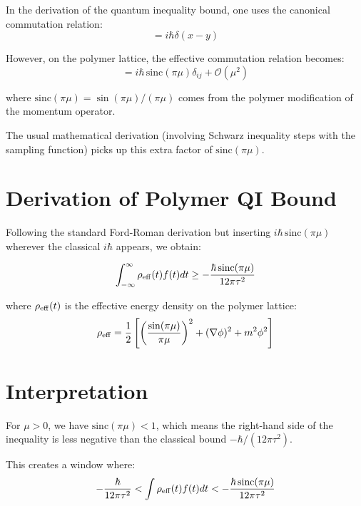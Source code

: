 \documentclass[11pt]{article}
\begin{document}
In the derivation of the quantum inequality bound, one uses the canonical commutation relation:
\begin{equation}
[\hat{\phi}(x), \hat{\pi}(y)] = i\hbar\delta(x-y)
\end{equation}

However, on the polymer lattice, the effective commutation relation becomes:
\begin{equation}
[\hat{\phi}_i, \hat{\pi}_j^{\rm poly}] = i\hbar\,\mathrm{sinc}(\pi\mu)\delta_{ij} + \mathcal{O}(\mu^2)
\end{equation}

where $\mathrm{sinc}(\pi\mu) = \sin(\pi\mu)/(\pi\mu)$ comes from the polymer modification of the momentum operator.

The usual mathematical derivation (involving Schwarz inequality steps with the sampling function) picks up this extra factor of $\mathrm{sinc}(\pi\mu)$.

\section{Derivation of Polymer QI Bound}

Following the standard Ford-Roman derivation but inserting $i\hbar\,\mathrm{sinc}(\pi\mu)$ wherever the classical $i\hbar$ appears, we obtain:

\begin{equation}
\int_{-\infty}^{\infty} \rho_{\rm eff}(t) f(t) dt \geq -\frac{\hbar\,\mathrm{sinc}(\pi\mu)}{12\pi\tau^2}
\end{equation}

where $\rho_{\rm eff}(t)$ is the effective energy density on the polymer lattice:
\begin{equation}
\rho_{\rm eff} = \frac{1}{2}\left[\left(\frac{\sin(\pi\mu)}{\pi\mu}\right)^2 + (\nabla\phi)^2 + m^2\phi^2\right]
\end{equation}

\section{Interpretation}

For $\mu > 0$, we have $\mathrm{sinc}(\pi\mu) < 1$, which means the right-hand side of the inequality is less negative than the classical bound $-\hbar/(12\pi\tau^2)$.

This creates a window where:
\begin{equation}
-\frac{\hbar}{12\pi\tau^2} < \int \rho_{\rm eff}(t) f(t) dt < -\frac{\hbar\,\mathrm{sinc}(\pi\mu)}{12\pi\tau^2}
\end{equation}
\end{document}
